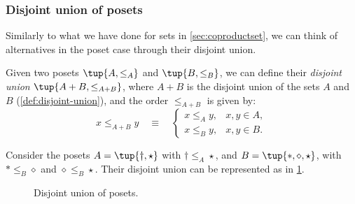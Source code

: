 \subsubsection{Disjoint union of posets}

Similarly to what we have done for sets in \cref{sec:coproductset}, we can think of alternatives in the poset case through their disjoint union.

\begin{definition}
Given two posets $\tup{A, \leq_A} $ and $\tup{B, \leq_B} $,
we can define their \emph{disjoint union} $\tup{ A + B, \leq_{A + B}}$, where $A + B$
is the disjoint union of the sets $A$ and $B$ (\cref{def:disjoint-union}), and the
order $\leq_{A + B}$ is given by:
\begin{equation}
    x \leq_{A + B} y \quad\equiv\quad
    \begin{cases}
        x \leq_A y, & x,y \in A, \\
        x \leq_B y, & x,y \in B.
    \end{cases}
\end{equation}
\end{definition}


\begin{example}
Consider the posets $A=\tup{\dagger, \star}$ with $\dagger \leq_A \star$, and $B=\tup{\ast,\diamond,\star}$, with $\ast \leq_B \diamond$ and $\diamond \leq_B \star$. Their disjoint union can be represented as in \cref{fig:poset-coproduct}.

\begin{figure}[h!]
    \centering
    \caption{Disjoint union of posets. \label{fig:poset-coproduct}}
\end{figure}
\end{example}
